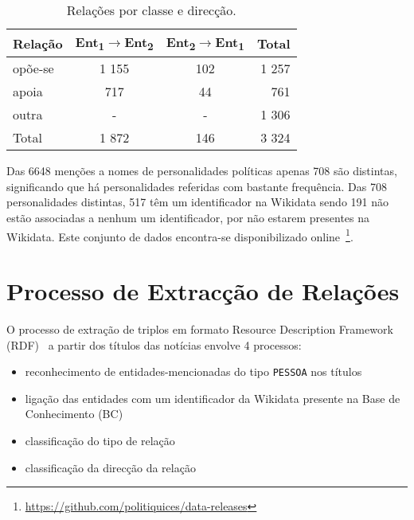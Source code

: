 \documentclass[a4paper, twocolumn, 11pt, twoside]{article}
\begin{document}

\begin{table}
    \begin{center}
    \begin{tabular}{l ccr}
        {\bf Relação} & {\bf \footnotesize{Ent\textsubscript{1}$\rightarrow$Ent\textsubscript{2}}} & {\bf \footnotesize{Ent\textsubscript{2}$\rightarrow$Ent\textsubscript{1}}} & {\bf Total} \\
        \hline
        opõe-se          &  1 155  &  102  &  1 257  \\
        apoia            &    717  &   44  &    761  \\
        outra            &    -    &   -   &  1 306  \\
		\hline
		Total			 &  1 872  &  146  &  3 324  \\
    \end{tabular}
	\caption{Relações por classe e direcção.}
	\label{tab:rel_dataset}
	\end{center}
\end{table}


Das 6648 menções a nomes de personalidades políticas apenas 708 são distintas, significando que há personalidades referidas com bastante frequência. Das 708 personalidades distintas, 517 têm um identificador na Wikidata sendo 191 não estão associadas a nenhum um identificador, por não estarem presentes na Wikidata. Este conjunto de dados encontra-se disponibilizado online~\footnote{\url{https://github.com/politiquices/data-releases}}.

\section{Processo de Extracção de Relações}
\label{sec:classifiers}

O processo de extração de triplos em formato Resource Description Framework (RDF)~\citep{schreiber2014primer} a partir dos títulos das notícias envolve 4 processos: 

\begin{itemize}
\item reconhecimento de entidades-mencionadas do tipo \texttt{PESSOA} nos títulos
\item ligação das entidades com um identificador da Wikidata presente na Base de Conhecimento (BC)
\item classificação do tipo de relação
\item classificação da direcção da relação
\end{itemize}
\end{document}
